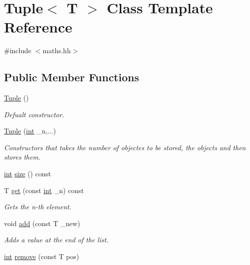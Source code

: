 \hypertarget{class_tuple}{}\section{Tuple$<$ T $>$ Class Template Reference}
\label{class_tuple}


{\ttfamily \#include $<$maths.\+hh$>$}

\subsection*{Public Member Functions}
\begin{DoxyCompactItemize}
\item 
\mbox{\hyperlink{class_tuple_ae8bde0e2215d6d5235a2a45195f7bfae}{Tuple}} ()
\begin{DoxyCompactList}\small\item\em Defualt constructor. \end{DoxyCompactList}\item 
\mbox{\hyperlink{class_tuple_af64f6017bf08af095addedf084863f22}{Tuple}} (\mbox{\hyperlink{draw_8hh_aa620a13339ac3a1177c86edc549fda9b}{int}} \+\_\+n,...)
\begin{DoxyCompactList}\small\item\em Constructors that takes the number of objectes to be stored, the objects and then stores them. \end{DoxyCompactList}\item 
\mbox{\hyperlink{draw_8hh_aa620a13339ac3a1177c86edc549fda9b}{int}} \mbox{\hyperlink{class_tuple_a8fffdb4c6d86d10fcf4aee1b0261e4ba}{size}} () const
\item 
T \mbox{\hyperlink{class_tuple_aabf82c5d0f19c9a8f6a8f01d95801162}{get}} (const \mbox{\hyperlink{draw_8hh_aa620a13339ac3a1177c86edc549fda9b}{int}} \+\_\+n) const
\begin{DoxyCompactList}\small\item\em Gets the n-\/th element. \end{DoxyCompactList}\item 
void \mbox{\hyperlink{class_tuple_a5d3ee2809d790543195a6e2075aef7d0}{add}} (const T \+\_\+new)
\begin{DoxyCompactList}\small\item\em Adds a value at the end of the list. \end{DoxyCompactList}\item 
\mbox{\hyperlink{draw_8hh_aa620a13339ac3a1177c86edc549fda9b}{int}} \mbox{\hyperlink{class_tuple_a53a1abc3017d30cf1a6d6858caee8ce8}{remove}} (const T pos)

\end{DoxyCompactItemize}
